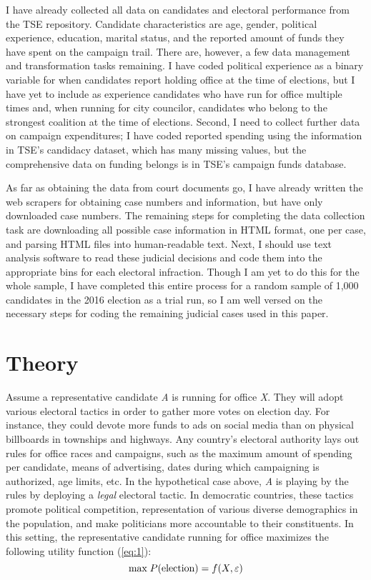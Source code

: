 \documentclass[11pt]{article}
\newcommand{\refp}[1]{(\ref{#1})}
\begin{document}
I have already collected all data on candidates and electoral performance from the TSE repository. Candidate characteristics are age, gender, political experience, education, marital status, and the reported amount of funds they have spent on the campaign trail. There are, however, a few data management and transformation tasks remaining. I have coded political experience as a binary variable for when candidates report holding office at the time of elections, but I have yet to include as experience candidates who have run for office multiple times and, when running for city councilor, candidates who belong to the strongest coalition at the time of elections. Second, I need to collect further data on campaign expenditures; I have coded reported spending using the information in TSE's candidacy dataset, which has many missing values, but the comprehensive data on funding belongs is in TSE's campaign funds database.

As far as obtaining the data from court documents go, I have already written the web scrapers for obtaining case numbers and information, but have only downloaded case numbers. The remaining steps for completing the data collection task are downloading all possible case information in HTML format, one per case, and parsing HTML files into human-readable text. Next, I should use text analysis software to read these judicial decisions and code them into the appropriate bins for each electoral infraction. Though I am yet to do this for the whole sample, I have completed this entire process for a random sample of 1,000 candidates in the 2016 election as a trial run, so I am well versed on the necessary steps for coding the remaining judicial cases used in this paper.

\section{Theory} \label{sec:theory_paper1}

Assume a representative candidate \emph{A} is running for office \emph{X}. They will adopt various electoral tactics in order to gather more votes on election day. For instance, they could devote more funds to ads on social media than on physical billboards in townships and highways. Any country's electoral authority lays out rules for office races and campaigns, such as the maximum amount of spending per candidate, means of advertising, dates during which campaigning is authorized, age limits, etc. In the hypothetical case above, \emph{A} is playing by the rules by deploying a \emph{legal} electoral tactic. In democratic countries, these tactics promote political competition, representation of various diverse demographics in the population, and make politicians more accountable to their constituents. In this setting, the representative candidate running for office maximizes the following utility function \refp{eq:1}: \\
\begin{equation} \label{eq:1}
  \text{max} \thickspace P(\text{election}) = f(X, \varepsilon)
\end{equation}
\end{document}
